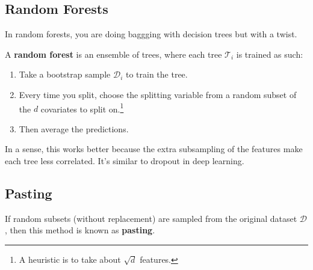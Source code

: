 \subsection{Random Forests} 

  In random forests, you are doing baggging with decision trees but with a twist. 

  \begin{definition}
    \label{def:random-forests}
    A \textbf{random forest} is an ensemble of trees, where each tree $\mathcal{T}_i$ is trained as such: 
    \begin{enumerate}
      \item Take a bootstrap sample $\mathcal{D}_i$ to train the tree. 
      \item Every time you split, choose the splitting variable from a random subset of the $d$ covariates to split on.\footnote{A heuristic is to take about $\sqrt{d}$ features.} 
      \item Then average the predictions. 
    \end{enumerate}
  \end{definition}

  In a sense, this works better because the extra subsampling of the features make each tree less correlated. It's similar to dropout in deep learning. 

\subsection{Pasting}

  \begin{definition}[Pasting]
    \label{def:pasting}
    If random subsets (without replacement) are sampled from the original dataset $\mathcal{D}$, then this method is known as \textbf{pasting}. 
  \end{definition}

